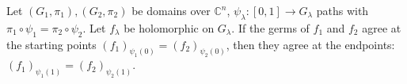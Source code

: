 Let $(G_1, \pi_1), (G_2, \pi_2)$ be domains over $\mathbb{C}^n$, $\psi_\lambda: [0,1] \to G_\lambda$ paths with $\pi_1 \circ \psi_1 = \pi_2 \circ \psi_2$. Let $f_\lambda$ be holomorphic on $G_\lambda$. If the germs of $f_1$ and $f_2$ agree at the starting points $(f_1)_{\psi_1(0)} = (f_2)_{\psi_2(0)}$, then they agree at the endpoints: $(f_1)_{\psi_1(1)} = (f_2)_{\psi_2(1)}$.
